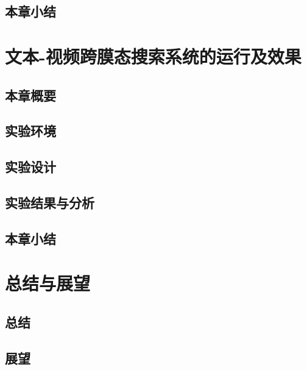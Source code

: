 \documentclass[12pt,a4paper,fancyhdr,openany,oneside]{ctexbook}
\begin{document}
\section{本章小结}

\chapter{文本-视频跨膜态搜索系统的运行及效果}
\section{本章概要}
\section{实验环境}
\section{实验设计}
\section{实验结果与分析}
\section{本章小结}

\chapter{总结与展望}
\section{总结}
\section{展望}
\end{document}
